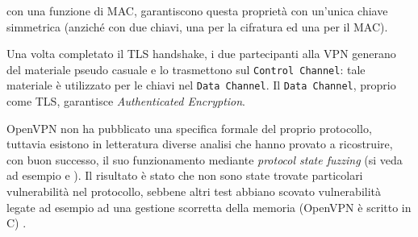 con una funzione di MAC, garantiscono questa proprietà con un'unica chiave simmetrica
(anziché con due chiavi, una per la cifratura ed una per il MAC).


Una volta completato il TLS handshake, i due partecipanti alla VPN
generano del materiale pseudo casuale e lo trasmettono sul \texttt{Control Channel}: tale
materiale è utilizzato per le chiavi nel \texttt{Data Channel}. Il \texttt{Data Channel},
proprio come TLS, garantisce \textit{Authenticated Encryption}.


OpenVPN non ha pubblicato una specifica formale del proprio protocollo, tuttavia
esistono in letteratura diverse analisi che hanno provato a ricostruire, con buon
successo, il suo funzionamento mediante \textit{protocol state fuzzing} (si veda
ad esempio \cite{openvpn-fuzz-1} e \cite{openvpn-fuzz-2}). Il risultato è stato
che non sono state trovate particolari vulnerabilità nel protocollo, sebbene
altri test abbiano scovato vulnerabilità
legate ad esempio ad una gestione scorretta della memoria (OpenVPN è scritto in C) \cite{openvpn-bug}.
